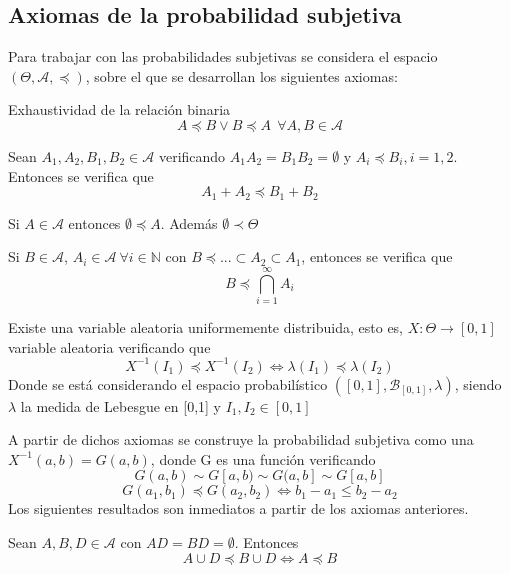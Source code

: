 \documentclass{article}
\begin{document}
\subsection{Axiomas de la probabilidad subjetiva}
    Para trabajar con las probabilidades subjetivas se considera el espacio $(\Theta, \mathcal{A}, \preceq )$, sobre el que se desarrollan los siguientes axiomas:


    \begin{axiom}
        Exhaustividad de la relación binaria
        $$A\preceq B \vee B\preceq A\ \ \forall A,B\in \mathcal{A} $$
    \end{axiom}

    \begin{axiom}
        Sean $A_1,A_2,B_1,B_2 \in \mathcal{A}$ verificando $A_1A_2 = B_1B_2 = \emptyset$ y $A_i \preceq B_i, i = 1,2$. Entonces se verifica que
        $$A_1+A_2 \preceq B_1+B_2$$
    \end{axiom}


    \begin{axiom}
        Si $A\in \mathcal{A}$ entonces $\emptyset \preceq A$. Además $\emptyset \prec \Theta$
    \end{axiom}

    \begin{axiom}
        Si $B\in \mathcal{A}$, $A_i \in \mathcal{A}\ \forall i \in \mathbb{N}$ con $B\preceq ... \subset A_2 \subset A_1$, entonces se verifica que
        $$B\preceq \bigcap\limits_{i = 1}^{\infty}A_i$$
    \end{axiom}

    \begin{axiom}
        Existe una variable aleatoria uniformemente distribuida, esto es, $X:\Theta \longrightarrow [0,1]$ variable aleatoria verificando que
        $$X^{-1}({I_1}) \preceq X^{-1}({I_2}) \Longleftrightarrow \lambda(I_1)\preceq \lambda(I_2)$$
        Donde se está considerando el espacio probabilístico $([0,1],\mathcal{B}_{[0,1]},\lambda)$, siendo $\lambda $ la medida de Lebesgue en [0,1] y $I_1,I_2\in [0,1]$
    \end{axiom}


    A partir de dichos axiomas se construye la probabilidad subjetiva como una $X^{-1}(a,b)=G(a,b)$, donde G es una función verificando
    $$G(a,b) \sim G[a,b) \sim G(a,b] \sim G[a,b]$$
    $$ G(a_1,b_1)\preceq G(a_2,b_2) \Longleftrightarrow b_1-a_1 \leq b_2 - a_2$$
    Los siguientes resultados son inmediatos a partir de los axiomas anteriores.

    \begin{lem}
        Sean $A,B,D\in\mathcal{A}$ con $AD = BD = \emptyset$. Entonces
        $$ A\cup D \preceq B\cup D  \Longleftrightarrow A \preceq B$$
    \end{lem}
\end{document}
